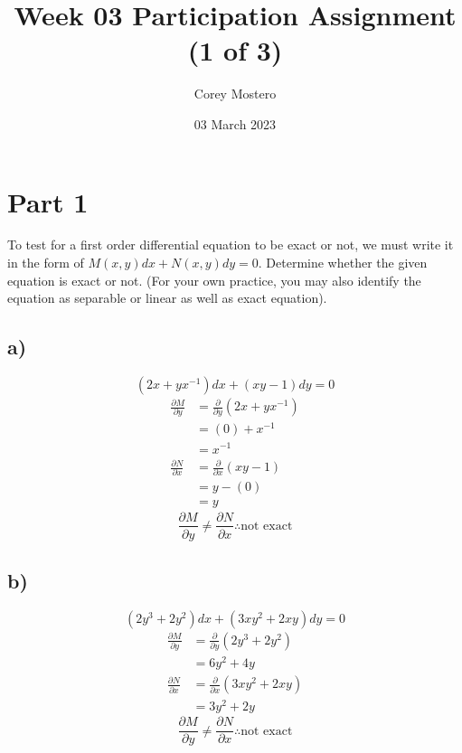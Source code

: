\documentclass{article}
\title{Week 03 Participation Assignment (1 of 3)}
\date{03 March 2023}
\author{Corey Mostero}
\begin{document}
\newcommand{\hr}{\par\noindent\rule{\textwidth}{0.4pt}}

\maketitle
\newpage

\tableofcontents

\section{Part 1}
To test for a first order differential equation to be exact or not, we must write it in the form of $ M(x,y)dx + N(x,y)dy = 0 $. Determine whether the given equation is exact or not. (For your own practice, you may also identify the equation as separable or linear as well as exact equation).

\subsection{a)}
$$ (2x + yx^{-1})dx + (xy - 1)dy = 0 $$
\begin{align*}
	\frac{\partial M}{\partial y} & = \frac{\partial}{\partial y} \left( 2x + yx^{-1} \right) \\
	& = (0) + x^{-1} \\
	& = x^{-1} \\
	\frac{\partial N}{\partial x} & = \frac{\partial}{\partial x} \left( xy - 1 \right) \\
	& = y - (0) \\
	& = y
\end{align*}
\begin{equation*}
	\boxed{
		\frac{\partial M}{\partial y} \neq \frac{\partial N}{\partial x} \therefore \text{not exact}
	}
\end{equation*}

\subsection{b)}
$$ (2y^3 + 2y^2)dx + (3xy^2 + 2xy)dy = 0 $$
\begin{align*}
	\frac{\partial M}{\partial y} & = \frac{\partial}{\partial y} \left( 2y^3 + 2y^2 \right) \\
								  & = 6y^2 + 4y \\
	\frac{\partial N}{\partial x} & = \frac{\partial}{\partial x} \left( 3xy^2 + 2xy \right) \\
								  & = 3y^2 + 2y
\end{align*}
\begin{equation*}
	\boxed{
		\frac{\partial M}{\partial y} \neq \frac{\partial N}{\partial x} \therefore \text{not exact}
	}
\end{equation*}
\end{document}
